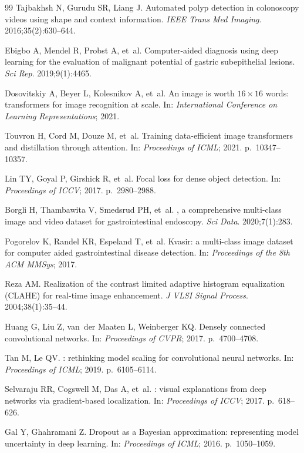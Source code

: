 \documentclass[11pt,a4paper]{article}
\begin{document}
\begin{thebibliography}{99}
Tajbakhsh N, Gurudu SR, Liang J.
\newblock Automated polyp detection in colonoscopy videos using shape and
  context information.
\newblock \emph{IEEE Trans Med Imaging}. 2016;35(2):630--644.

Ebigbo A, Mendel R, Probst A, et~al.
\newblock Computer-aided diagnosis using deep learning for the evaluation of
  malignant potential of gastric subepithelial lesions.
\newblock \emph{Sci Rep}. 2019;9(1):4465.

Dosovitskiy A, Beyer L, Kolesnikov A, et~al.
\newblock An image is worth $16\times16$ words: transformers for image
  recognition at scale.
\newblock In: \emph{International Conference on Learning Representations};
  2021.

Touvron H, Cord M, Douze M, et~al.
\newblock Training data-efficient image transformers and distillation through
  attention.
\newblock In: \emph{Proceedings of ICML}; 2021. p.~10347--10357.


Lin TY, Goyal P, Girshick R, et~al.
\newblock Focal loss for dense object detection.
\newblock In: \emph{Proceedings of ICCV}; 2017. p.~2980--2988.

Borgli H, Thambawita V, Smedsrud PH, et~al.
, a comprehensive multi-class image and video dataset
  for gastrointestinal endoscopy.
\newblock \emph{Sci Data}. 2020;7(1):283.

Pogorelov K, Randel KR, Espeland T, et~al.
\newblock Kvasir: a multi-class image dataset for computer aided
  gastrointestinal disease detection.
\newblock In: \emph{Proceedings of the 8th ACM MMSys}; 2017.

Reza AM.
\newblock Realization of the contrast limited adaptive histogram equalization
  ({CLAHE}) for real-time image enhancement.
\newblock \emph{J VLSI Signal Process}. 2004;38(1):35--44.

Huang G, Liu Z, van~der Maaten L, Weinberger KQ.
\newblock Densely connected convolutional networks.
\newblock In: \emph{Proceedings of CVPR}; 2017. p.~4700--4708.

Tan M, Le QV.
: rethinking model scaling for convolutional neural
  networks.
\newblock In: \emph{Proceedings of ICML}; 2019. p.~6105--6114.

Selvaraju RR, Cogswell M, Das A, et~al.
: visual explanations from deep networks via
  gradient-based localization.
\newblock In: \emph{Proceedings of ICCV}; 2017. p.~618--626.

Gal Y, Ghahramani Z.
\newblock Dropout as a {Bayesian} approximation: representing model uncertainty
  in deep learning.
\newblock In: \emph{Proceedings of ICML}; 2016. p.~1050--1059.

\end{thebibliography}
\end{document}
